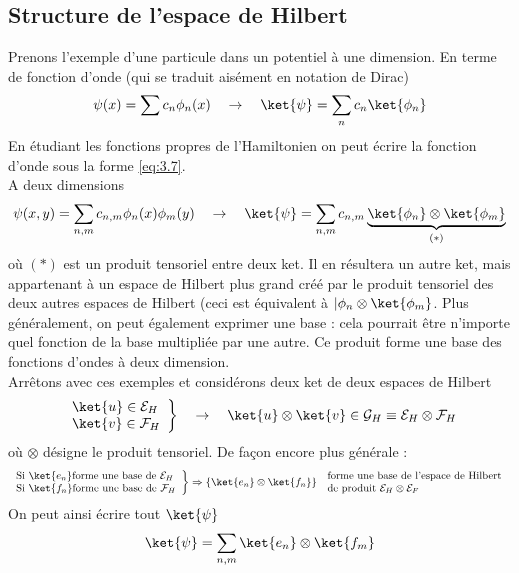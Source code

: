  \subsection{Structure de l'espace de Hilbert}
 Prenons l'exemple d'une particule dans un potentiel à une dimension. En terme de fonction d'onde
 (qui se traduit aisément en notation de Dirac)
 \begin{equation}
 \psi(x) = \sum c_n\phi_n(x)\quad \rightarrow\quad \ket{\psi} = \sum_n c_n
 \ket{\phi_n}
 \label{eq:3.7}
 \end{equation}
 En étudiant les fonctions propres de l'Hamiltonien on peut écrire la fonction 
 d'onde sous la forme \autoref{eq:3.7}.\\
 A deux dimensions
 \begin{equation}
 \psi(x,y) = \sum_{n,m} c_{n,m}\phi_n(x)\phi_m(y)\quad\rightarrow\quad
 \ket{\psi} = \sum_{n,m} c_{n,m} \underbrace{\ket{\phi_n}\otimes\ket{\phi_m}}_{(*)}
 \end{equation}
 où $(*)$ est un produit tensoriel entre deux ket. Il en résultera un autre ket, 
 mais appartenant à un espace de Hilbert plus grand créé par le produit tensoriel
 des deux autres espaces de Hilbert (ceci est équivalent à 
 $|\phi_n\otimes\ket{\phi_m}$. Plus généralement, on peut également exprimer une base :
  cela pourrait être n'importe quel fonction de la base multipliée par une autre. Ce
 produit forme une base des fonctions d'ondes à deux dimension. \\
 
 Arrêtons avec ces exemples et considérons deux ket de deux espaces de Hilbert
 \begin{equation}
 \left.\begin{array}{ll}
 \ket{u} \in \mathcal{E}_H\\
 \ket{v} \in \mathcal{F}_H 
 \end{array}\right\}\quad\rightarrow\quad \ket{u}\otimes\ket{v} \in\mathcal{G}_H 
 \equiv \mathcal{E}_H\otimes\mathcal{F}_H
 \end{equation}
 où $\otimes$ désigne le produit tensoriel. De façon encore plus générale :
 \begin{equation}
 \left.\begin{array}{l}
 \text{Si } \ket{e_n} \text{forme une base de } \mathcal{E}_H\\
 \text{Si } \ket{f_n} \text{forme une base de } \mathcal{F}_H
 \end{array}\right\}\Rightarrow \left\{\ket{e_n}\otimes\ket{f_n}\right\} \begin{array}{l}
 \text{ forme  une base de l'espace de Hilbert }\\
 \text{  de produit $\mathcal{E}_H\otimes\mathcal{E}_F$}
 \end{array}
 \end{equation}
 On peut ainsi écrire tout $\ket{\psi}$
 \begin{equation}
 \ket{\psi} = \sum_{n,m} \ket{e_n}\otimes\ket{f_m}
 \end{equation}
 
